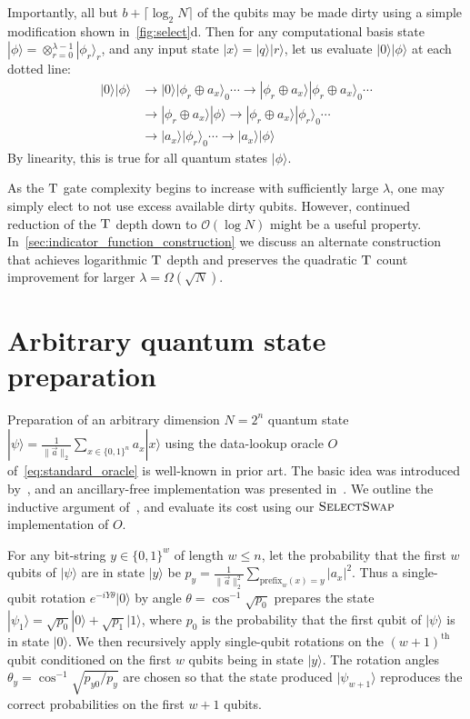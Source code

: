 \documentclass[a4paper,onecolumn,10pt,accepted=2024-05-22]{quantumarticle}
\newcommand{\ket}[1]{| #1\rangle}        %
\begin{document}
	
	Importantly, all but $b+\lceil\log_2 N\rceil$ of the qubits may be made dirty using a simple modification shown in~\cref{fig:select}d. Then for any computational basis state $\ket{\phi}=\otimes_{r=0}^{\lambda-1}\ket{\phi_r}_r$, and any input state $\ket{x}=\ket{q}\ket{r}$, let us evaluate $\ket{0}\ket{\phi}$ at each dotted line:
	\begin{align}\nonumber
	\ket{0}\ket{\phi}
	&\rightarrow\ket{0}\ket{\phi_r\oplus a_x}_0\cdots
	\rightarrow\ket{\phi_r\oplus a_x}\ket{\phi_r\oplus a_x}_0\cdots\\\nonumber
	&\rightarrow\ket{\phi_r\oplus a_x}\ket{\phi}
	\rightarrow\ket{\phi_r\oplus a_x}\ket{\phi_r}_0\cdots
	\\
	&\rightarrow\ket{a_x}\ket{\phi_r}_0\cdots\rightarrow\ket{a_x}\ket{\phi}
	\end{align}
	By linearity, this is true for all quantum states $\ket{\phi}$.
	
	
	As the $\textsc{T}$ gate complexity begins to increase with sufficiently large $\lambda$, one may simply elect to not use excess available dirty qubits. However, continued reduction of the $\textsc{T}$ depth down to $\mathcal{O}(\log{N})$ might be a useful property. In~\cref{sec:indicator_function_construction} we discuss an alternate construction that achieves logarithmic $\textsc{T}$ depth and preserves the quadratic $\textsc{T}$ count improvement for larger $\lambda=\Omega(\sqrt{N})$.
	
	\section{Arbitrary quantum state preparation}
	Preparation of an arbitrary dimension $N=2^n$ quantum state $\ket{\psi}=\frac{1}{\|\vec{a}\|_2}\sum_{x\in\{0,1\}^n} a_x \ket{x}$ using the data-lookup oracle $O$ of~\cref{eq:standard_oracle} is well-known in prior art. The basic idea was introduced by~\cite{Grover2002creating}, and an ancillary-free implementation was presented in~\cite{shende2006synthesis}. We outline the inductive argument of~\cite{Aaronson2016complexity}, and evaluate its cost using our $\textsc{SelectSwap}$ implementation of $O$.
	
	For any bit-string $y\in\{0,1\}^w$ of length $w\le n$, let the probability that the first $w$ qubits of $\ket{\psi}$ are in state $\ket{y}$ be $p_y=\frac{1}{\|\vec{a}\|^2_2}\sum_{\mathrm{prefix}_w(x)=y}|a_x|^2$. Thus a single-qubit rotation $e^{-iY\theta}\ket{0}$ by angle $\theta=\cos^{-1}\sqrt{p_0}$ prepares the state $\ket{\psi_1}=\sqrt{p_0}\ket{0}+\sqrt{p_1}\ket{1}$, where $p_0$ is the probability that the first qubit of $\ket{\psi}$ is in state $\ket{0}$. We then recursively apply single-qubit rotations on the $(w+1)^{\mathrm{th}}$ qubit conditioned on the first $w$ qubits being in state $\ket{y}$. The rotation angles $\theta_y=\cos^{-1}{\sqrt{p_{y0}/p_y}}$ are chosen so that the state produced $\ket{\psi_{w+1}}$ reproduces the correct probabilities on the first $w+1$ qubits. 
	
\end{document}
